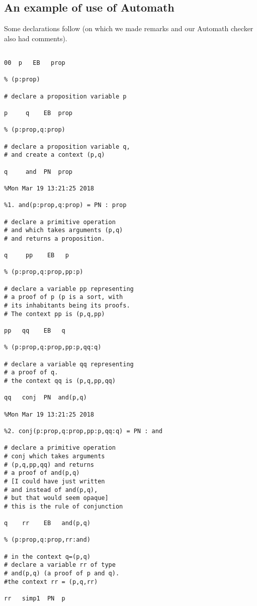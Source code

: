\documentclass[12pt]{article}
\begin{document}
\subsection{An example of use of Automath}

Some declarations follow (on which we made remarks and our Automath checker also had comments).


\begin{verbatim}

00  p   EB   prop

% (p:prop)

# declare a proposition variable p

p     q    EB  prop

% (p:prop,q:prop)

# declare a proposition variable q,
# and create a context (p,q)

q     and  PN  prop

%Mon Mar 19 13:21:25 2018

%1. and(p:prop,q:prop) = PN : prop

# declare a primitive operation
# and which takes arguments (p,q)
# and returns a proposition.

q     pp    EB   p

% (p:prop,q:prop,pp:p)

# declare a variable pp representing
# a proof of p (p is a sort, with
# its inhabitants being its proofs.
# The context pp is (p,q,pp)

pp   qq    EB   q

% (p:prop,q:prop,pp:p,qq:q)

# declare a variable qq representing
# a proof of q.
# the context qq is (p,q,pp,qq)

qq   conj  PN  and(p,q)

%Mon Mar 19 13:21:25 2018

%2. conj(p:prop,q:prop,pp:p,qq:q) = PN : and

# declare a primitive operation
# conj which takes arguments
# (p,q,pp,qq) and returns
# a proof of and(p,q)
# [I could have just written
# and instead of and(p,q),
# but that would seem opaque]
# this is the rule of conjunction

q    rr    EB   and(p,q)

% (p:prop,q:prop,rr:and)

# in the context q=(p,q)
# declare a variable rr of type
# and(p,q) (a proof of p and q).
#the context rr = (p,q,rr)

rr   simp1  PN  p


\end{verbatim}
\end{document}
